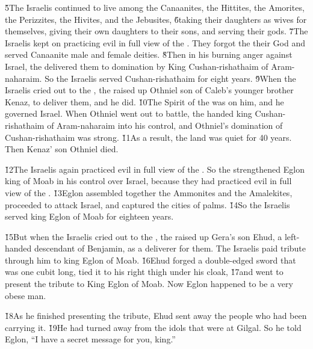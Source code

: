 \v{5}The Israelis continued to live among the Canaanites, the Hittites, the Amorites, the Perizzites, the Hivites, and the Jebusites, \v{6}taking their daughters as wives for themselves, giving their own daughters to their sons, and serving their gods. \v{7}The Israelis kept on practicing evil in full view of the . They forgot the  their God and served Canaanite male and female deities. \v{8}Then in his burning anger against Israel, the  delivered them to domination by King Cushan-rishathaim of Aram-naharaim. So the Israelis served Cushan-rishathaim for eight years. \v{9}When the Israelis cried out to the , the  raised up Othniel son of Caleb's younger brother Kenaz, to deliver them, and he did. \v{10}The Spirit of the  was on him, and he governed Israel. When Othniel went out to battle, the  handed king Cushan-rishathaim of Aram-naharaim into his control, and Othniel's domination of Cushan-rishathaim was strong. \v{11}As a result, the land was quiet for 40 years. Then Kenaz' son Othniel died.

\v{12}The Israelis again practiced evil in full view of the . So the  strengthened Eglon king of Moab in his control over Israel, because they had practiced evil in full view of the . \v{13}Eglon assembled together the Ammonites and the Amalekites, proceeded to attack Israel, and captured the cities of palms. \v{14}So the Israelis served king Eglon of Moab for eighteen years.

\v{15}But when the Israelis cried out to the , the  raised up Gera's son Ehud, a left-handed descendant of Benjamin, as a deliverer for them. The Israelis paid tribute through him to king Eglon of Moab. \v{16}Ehud forged a double-edged sword that was one cubit long, tied it to his right thigh under his cloak, \v{17}and went to present the tribute to King Eglon of Moab. Now Eglon happened to be a very obese man.

\v{18}As he finished presenting the tribute, Ehud sent away the people who had been carrying it. \v{19}He had turned away from the idols that were at Gilgal. So he told Eglon, ``I have a secret message for you, king.''

